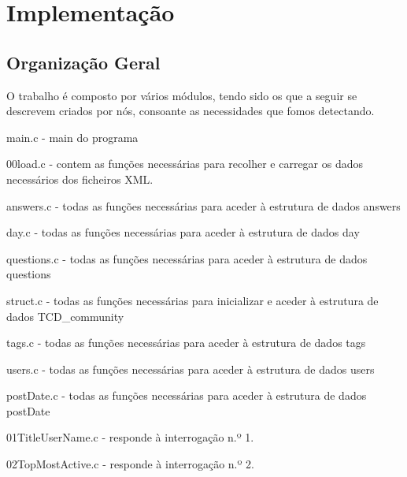 \documentclass[a4paper]{report}
\begin{document}
\chapter{Implementação}
\label{ch:implementacao}

\section{Organização Geral}
\label{sec:organizacao}

O trabalho é composto por vários módulos, tendo sido os que a seguir se descrevem
criados por nós, consoante as necessidades que fomos detectando.

\begin{itemize}
\begin{item} main.c - main do programa\end{item}
\begin{item} 00load.c - contem as funções necessárias para recolher e carregar os
dados necessários dos ficheiros XML.\end{item}
\begin{item} answers.c - todas as funções necessárias para aceder à estrutura de
dados answers\end{item}
\begin{item} day.c - todas as funções necessárias para aceder à estrutura de
dados day\end{item}
\begin{item} questions.c - todas as funções necessárias para aceder à estrutura de
dados questions\end{item}
\begin{item} struct.c - todas as funções necessárias para inicializar e aceder à
estrutura de dados TCD\_community\end{item}
\begin{item} tags.c - todas as funções necessárias para aceder à estrutura de
dados tags\end{item}
\begin{item} users.c - todas as funções necessárias para aceder à estrutura de
dados users\end{item}
\begin{item} postDate.c - todas as funções necessárias para aceder à estrutura de
dados postDate\end{item}
\begin{item} 01TitleUserName.c - responde à interrogação n.º 1.\end{item}
\begin{item} 02TopMostActive.c - responde à interrogação n.º 2.\end{item}

\end{itemize}
\end{document}
